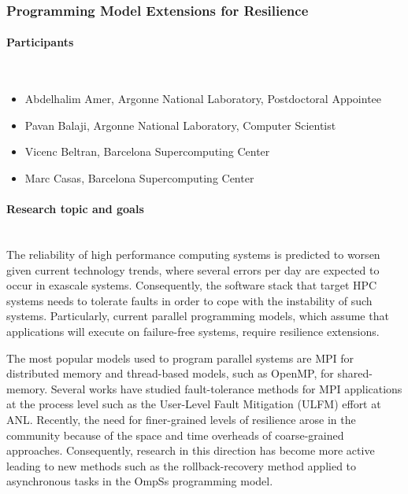 \subsubsection{Programming Model Extensions for Resilience}
\label{sec.report.pb3} %

\begin{refsection}

\paragraph{Participants}~\\

\begin{itemize}
\item Abdelhalim Amer, Argonne National Laboratory, Postdoctoral Appointee
\item Pavan Balaji, Argonne National Laboratory, Computer Scientist
\item Vicenc Beltran, Barcelona Supercomputing Center
\item Marc Casas, Barcelona Supercomputing Center 
\end{itemize}

\paragraph{Research topic and goals}~\\

The reliability of high performance computing systems is predicted to worsen
given current technology trends, where several errors per day are expected to
occur in exascale systems. Consequently, the software stack that target HPC
systems needs to tolerate faults in order to cope with the instability of such
systems. Particularly, current parallel programming models, which assume that
applications will execute on failure-free systems, require resilience extensions.

The most popular models used to program parallel systems are MPI for distributed
memory and thread-based models, such as OpenMP, for shared-memory. Several works
have studied fault-tolerance methods for MPI applications at the process level
such as the User-Level Fault Mitigation (ULFM) effort at ANL. Recently, the
need for finer-grained levels of resilience arose in the community because of
the space and time overheads of coarse-grained approaches. Consequently,
research in this direction has become more active leading to new methods
such as the rollback-recovery method applied to asynchronous tasks in the OmpSs
programming model.


\end{refsection}

